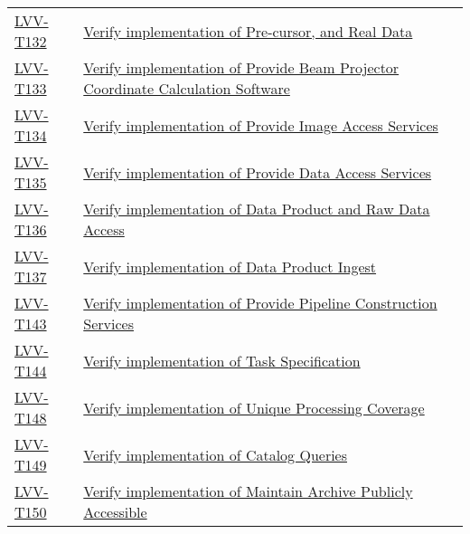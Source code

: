 \begin{longtable}[]{p{3cm}p{13cm}}
\protect\hyperlink{lvv-t132---verify-implementation-of-pre-cursor-and-real-data}{LVV-T132}
&
\href{https://jira.lsstcorp.org/secure/Tests.jspa\#/testCase/LVV-T132}{Verify
implementation of Pre-cursor, and Real Data}\tabularnewline
\protect\hyperlink{lvv-t133---verify-implementation-of-provide-beam-projector-coordinate-calculation-software}{LVV-T133}
&
\href{https://jira.lsstcorp.org/secure/Tests.jspa\#/testCase/LVV-T133}{Verify
implementation of Provide Beam Projector Coordinate Calculation
Software}\tabularnewline
\protect\hyperlink{lvv-t134---verify-implementation-of-provide-image-access-services}{LVV-T134}
&
\href{https://jira.lsstcorp.org/secure/Tests.jspa\#/testCase/LVV-T134}{Verify
implementation of Provide Image Access Services}\tabularnewline
\protect\hyperlink{lvv-t135---verify-implementation-of-provide-data-access-services}{LVV-T135}
&
\href{https://jira.lsstcorp.org/secure/Tests.jspa\#/testCase/LVV-T135}{Verify
implementation of Provide Data Access Services}\tabularnewline
\protect\hyperlink{lvv-t136---verify-implementation-of-data-product-and-raw-data-access}{LVV-T136}
&
\href{https://jira.lsstcorp.org/secure/Tests.jspa\#/testCase/LVV-T136}{Verify
implementation of Data Product and Raw Data Access}\tabularnewline
\protect\hyperlink{lvv-t137---verify-implementation-of-data-product-ingest}{LVV-T137}
&
\href{https://jira.lsstcorp.org/secure/Tests.jspa\#/testCase/LVV-T137}{Verify
implementation of Data Product Ingest}\tabularnewline
\protect\hyperlink{lvv-t143---verify-implementation-of-provide-pipeline-construction-services}{LVV-T143}
&
\href{https://jira.lsstcorp.org/secure/Tests.jspa\#/testCase/LVV-T143}{Verify
implementation of Provide Pipeline Construction Services}\tabularnewline
\protect\hyperlink{lvv-t144---verify-implementation-of-task-specification}{LVV-T144}
&
\href{https://jira.lsstcorp.org/secure/Tests.jspa\#/testCase/LVV-T144}{Verify
implementation of Task Specification}\tabularnewline
\protect\hyperlink{lvv-t148---verify-implementation-of-unique-processing-coverage}{LVV-T148}
&
\href{https://jira.lsstcorp.org/secure/Tests.jspa\#/testCase/LVV-T148}{Verify
implementation of Unique Processing Coverage}\tabularnewline
\protect\hyperlink{lvv-t149---verify-implementation-of-catalog-queries}{LVV-T149}
&
\href{https://jira.lsstcorp.org/secure/Tests.jspa\#/testCase/LVV-T149}{Verify
implementation of Catalog Queries}\tabularnewline
\protect\hyperlink{lvv-t150---verify-implementation-of-maintain-archive-publicly-accessible}{LVV-T150}
&
\href{https://jira.lsstcorp.org/secure/Tests.jspa\#/testCase/LVV-T150}{Verify
implementation of Maintain Archive Publicly Accessible}\tabularnewline

\end{longtable}
